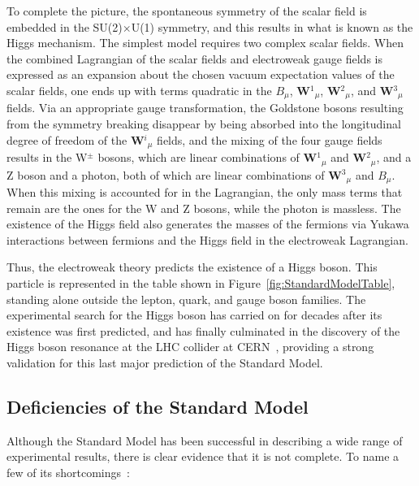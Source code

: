 To complete the picture, the spontaneous symmetry of the scalar field is embedded in the SU(2)$\times$U(1) symmetry, and this results in what is known as the Higgs mechanism. The simplest model requires two complex scalar fields. When the combined Lagrangian of the scalar fields and electroweak gauge fields is expressed as an expansion about the chosen vacuum expectation values of the scalar fields, one ends up with terms quadratic in the $B_{\mu}$, \textbf{W}$^1$$_{\mu}$, \textbf{W}$^2$$_{\mu}$, and \textbf{W}$^3$$_{\mu}$ fields. Via an appropriate gauge transformation, the Goldstone bosons resulting from the symmetry breaking disappear by being absorbed into the longitudinal degree of freedom of the \textbf{W}$^i$$_{\mu}$ fields, and the mixing of the four gauge fields results in the W$^{\pm}$ bosons, which are linear combinations of \textbf{W}$^1$$_{\mu}$ and \textbf{W}$^2$$_{\mu}$, and a Z boson and a photon, both of which are linear combinations of \textbf{W}$^3$$_{\mu}$ and $B_{\mu}$. When this mixing is accounted for in the Lagrangian, the only mass terms that remain are the ones for the W and Z bosons, while the photon is massless. The existence of the Higgs field also generates the masses of the fermions via Yukawa interactions between fermions and the Higgs field in the electroweak Lagrangian.

Thus, the electroweak theory predicts the existence of a Higgs boson. This particle is represented in the table shown in Figure~\ref{fig:StandardModelTable}, standing alone outside the lepton, quark, and gauge boson families. The experimental search for the Higgs boson has carried on for decades after its existence was first predicted, and has finally culminated in the discovery of the Higgs boson resonance at the LHC collider at CERN~\cite{Aad:2012tfa,Chatrchyan:2012ufa}, providing a strong validation for this last major prediction of the Standard Model.

\subsection{Deficiencies of the Standard Model\label{sec:SMdeficiencies}}

Although the Standard Model has been successful in describing a wide range of experimental results, there is clear evidence that it is not complete. To name a few of its shortcomings~\cite{BettiniPhysics}:

